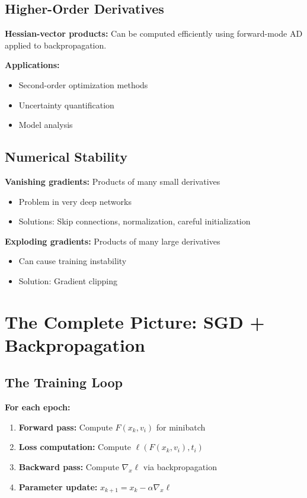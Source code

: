 \documentclass[11pt]{article}
\begin{document}
\subsection{Higher-Order Derivatives}
\textbf{Hessian-vector products:} Can be computed efficiently using forward-mode AD applied to backpropagation.

\textbf{Applications:}
\begin{itemize}
\item Second-order optimization methods
\item Uncertainty quantification
\item Model analysis
\end{itemize}

\subsection{Numerical Stability}
\textbf{Vanishing gradients:} Products of many small derivatives
\begin{itemize}
\item Problem in very deep networks
\item Solutions: Skip connections, normalization, careful initialization
\end{itemize}

\textbf{Exploding gradients:} Products of many large derivatives
\begin{itemize}
\item Can cause training instability
\item Solution: Gradient clipping
\end{itemize}

\section{The Complete Picture: SGD + Backpropagation}

\subsection{The Training Loop}
\textbf{For each epoch:}
\begin{enumerate}
\item \textbf{Forward pass:} Compute $F(x_k, v_i)$ for minibatch
\item \textbf{Loss computation:} Compute $\ell(F(x_k, v_i), t_i)$
\item \textbf{Backward pass:} Compute $\nabla_x \ell$ via backpropagation
\item \textbf{Parameter update:} $x_{k+1} = x_k - \alpha \nabla_x \ell$
\end{enumerate}
\end{document}
